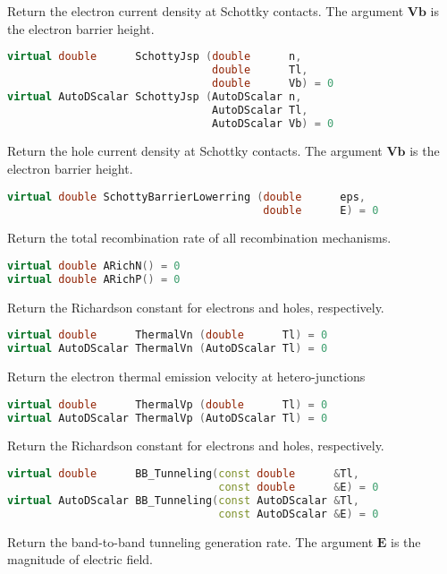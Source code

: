\documentclass[oneside,12pt]{cgd_book}
\begin{document}
Return the electron current density at Schottky contacts. The argument
$\mathbf{Vb}$ is
            the electron barrier height.
\par
\begin{lstlisting}[language={C++}]
virtual double      SchottyJsp (double      n,
                                double      Tl,
                                double      Vb) = 0
virtual AutoDScalar SchottyJsp (AutoDScalar n,
                                AutoDScalar Tl,
                                AutoDScalar Vb) = 0
\end{lstlisting}
Return the hole current density at Schottky contacts. The argument
$\mathbf{Vb}$ is the
            electron barrier height.
\par
\begin{lstlisting}[language={C++}]
virtual double SchottyBarrierLowerring (double      eps,
                                        double      E) = 0
\end{lstlisting}
Return the total recombination rate of all recombination mechanisms.
\par
\begin{lstlisting}[language={C++}]
virtual double ARichN() = 0
virtual double ARichP() = 0
\end{lstlisting}
Return the Richardson constant for electrons and holes, respectively.
\par
\begin{lstlisting}[language={C++}]
virtual double      ThermalVn (double      Tl) = 0
virtual AutoDScalar ThermalVn (AutoDScalar Tl) = 0
\end{lstlisting}
Return the electron thermal emission velocity at hetero-junctions
\par
\begin{lstlisting}[language={C++}]
virtual double      ThermalVp (double      Tl) = 0
virtual AutoDScalar ThermalVp (AutoDScalar Tl) = 0
\end{lstlisting}
Return the Richardson constant for electrons and holes, respectively.
\par
\begin{lstlisting}[language={C++}]
virtual double      BB_Tunneling(const double      &Tl,
                                 const double      &E) = 0
virtual AutoDScalar BB_Tunneling(const AutoDScalar &Tl,
                                 const AutoDScalar &E) = 0
\end{lstlisting}
Return the band-to-band tunneling generation rate. The argument
$\mathbf{E}$ is the
            magnitude of electric field.
\par
\end{document}
